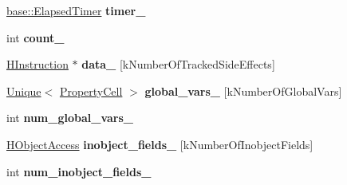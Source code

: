 \begin{DoxyCompactItemize}
\item 
\hyperlink{classv8_1_1base_1_1_elapsed_timer}{base\+::\+Elapsed\+Timer} {\bfseries timer\+\_\+}\hypertarget{classv8_1_1internal_1_1_b_a_s_e___e_m_b_e_d_d_e_d_a14813e1bb39788c920054818072dfe2c}{}\label{classv8_1_1internal_1_1_b_a_s_e___e_m_b_e_d_d_e_d_a14813e1bb39788c920054818072dfe2c}

\item 
int {\bfseries count\+\_\+}\hypertarget{classv8_1_1internal_1_1_b_a_s_e___e_m_b_e_d_d_e_d_a6380512be1a16afc5dbbe3fe817f1f39}{}\label{classv8_1_1internal_1_1_b_a_s_e___e_m_b_e_d_d_e_d_a6380512be1a16afc5dbbe3fe817f1f39}

\item 
\hyperlink{classv8_1_1internal_1_1_h_instruction}{H\+Instruction} $\ast$ {\bfseries data\+\_\+} \mbox{[}k\+Number\+Of\+Tracked\+Side\+Effects\mbox{]}\hypertarget{classv8_1_1internal_1_1_b_a_s_e___e_m_b_e_d_d_e_d_afe11150acc642157e6b34b751c884358}{}\label{classv8_1_1internal_1_1_b_a_s_e___e_m_b_e_d_d_e_d_afe11150acc642157e6b34b751c884358}

\item 
\hyperlink{classv8_1_1internal_1_1_unique}{Unique}$<$ \hyperlink{classv8_1_1internal_1_1_property_cell}{Property\+Cell} $>$ {\bfseries global\+\_\+vars\+\_\+} \mbox{[}k\+Number\+Of\+Global\+Vars\mbox{]}\hypertarget{classv8_1_1internal_1_1_b_a_s_e___e_m_b_e_d_d_e_d_a1ebcac75ce3d6002398ed615ad8b728c}{}\label{classv8_1_1internal_1_1_b_a_s_e___e_m_b_e_d_d_e_d_a1ebcac75ce3d6002398ed615ad8b728c}

\item 
int {\bfseries num\+\_\+global\+\_\+vars\+\_\+}\hypertarget{classv8_1_1internal_1_1_b_a_s_e___e_m_b_e_d_d_e_d_a4da17b0616c38b2d9c78c74e130ca9e4}{}\label{classv8_1_1internal_1_1_b_a_s_e___e_m_b_e_d_d_e_d_a4da17b0616c38b2d9c78c74e130ca9e4}

\item 
\hyperlink{classv8_1_1internal_1_1_h_object_access}{H\+Object\+Access} {\bfseries inobject\+\_\+fields\+\_\+} \mbox{[}k\+Number\+Of\+Inobject\+Fields\mbox{]}\hypertarget{classv8_1_1internal_1_1_b_a_s_e___e_m_b_e_d_d_e_d_adb1e74003cc3040d307b6449a85b3fbf}{}\label{classv8_1_1internal_1_1_b_a_s_e___e_m_b_e_d_d_e_d_adb1e74003cc3040d307b6449a85b3fbf}

\item 
int {\bfseries num\+\_\+inobject\+\_\+fields\+\_\+}\hypertarget{classv8_1_1internal_1_1_b_a_s_e___e_m_b_e_d_d_e_d_ad9cd43454587d5beeefdb28c294ca005}{}\label{classv8_1_1internal_1_1_b_a_s_e___e_m_b_e_d_d_e_d_ad9cd43454587d5beeefdb28c294ca005}


\end{DoxyCompactItemize}
